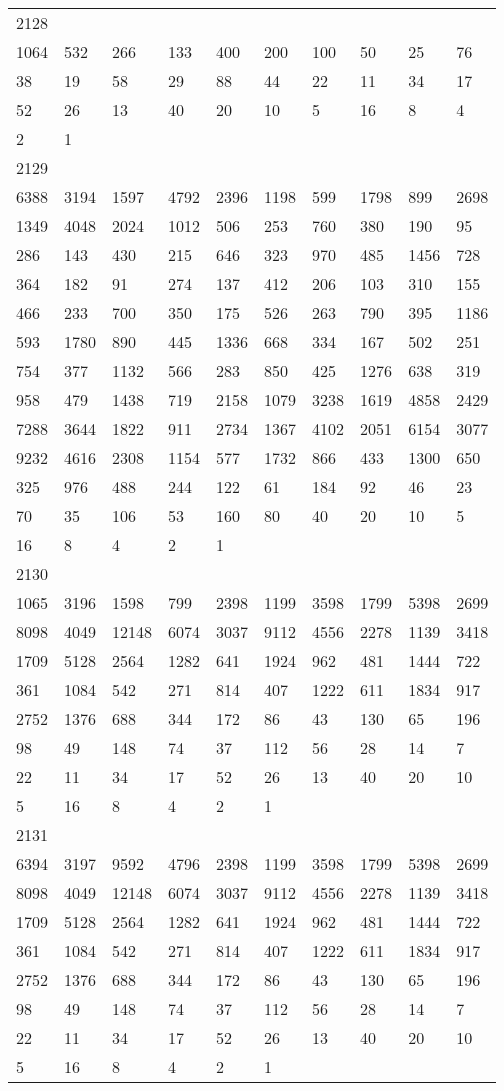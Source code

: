 \begin{longtable}{*{10}{l}}
2128&&&&&&&&&\\
1064& 532& 266& 133& 400& 200& 100& 50& 25& 76\\
38& 19& 58& 29& 88& 44& 22& 11& 34& 17\\
52& 26& 13& 40& 20& 10& 5& 16& 8& 4\\
2& 1& \\

2129&&&&&&&&&\\
6388& 3194& 1597& 4792& 2396& 1198& 599& 1798& 899& 2698\\
1349& 4048& 2024& 1012& 506& 253& 760& 380& 190& 95\\
286& 143& 430& 215& 646& 323& 970& 485& 1456& 728\\
364& 182& 91& 274& 137& 412& 206& 103& 310& 155\\
466& 233& 700& 350& 175& 526& 263& 790& 395& 1186\\
593& 1780& 890& 445& 1336& 668& 334& 167& 502& 251\\
754& 377& 1132& 566& 283& 850& 425& 1276& 638& 319\\
958& 479& 1438& 719& 2158& 1079& 3238& 1619& 4858& 2429\\
7288& 3644& 1822& 911& 2734& 1367& 4102& 2051& 6154& 3077\\
9232& 4616& 2308& 1154& 577& 1732& 866& 433& 1300& 650\\
325& 976& 488& 244& 122& 61& 184& 92& 46& 23\\
70& 35& 106& 53& 160& 80& 40& 20& 10& 5\\
16& 8& 4& 2& 1& \\

2130&&&&&&&&&\\
1065& 3196& 1598& 799& 2398& 1199& 3598& 1799& 5398& 2699\\
8098& 4049& 12148& 6074& 3037& 9112& 4556& 2278& 1139& 3418\\
1709& 5128& 2564& 1282& 641& 1924& 962& 481& 1444& 722\\
361& 1084& 542& 271& 814& 407& 1222& 611& 1834& 917\\
2752& 1376& 688& 344& 172& 86& 43& 130& 65& 196\\
98& 49& 148& 74& 37& 112& 56& 28& 14& 7\\
22& 11& 34& 17& 52& 26& 13& 40& 20& 10\\
5& 16& 8& 4& 2& 1& \\

2131&&&&&&&&&\\
6394& 3197& 9592& 4796& 2398& 1199& 3598& 1799& 5398& 2699\\
8098& 4049& 12148& 6074& 3037& 9112& 4556& 2278& 1139& 3418\\
1709& 5128& 2564& 1282& 641& 1924& 962& 481& 1444& 722\\
361& 1084& 542& 271& 814& 407& 1222& 611& 1834& 917\\
2752& 1376& 688& 344& 172& 86& 43& 130& 65& 196\\
98& 49& 148& 74& 37& 112& 56& 28& 14& 7\\
22& 11& 34& 17& 52& 26& 13& 40& 20& 10\\
5& 16& 8& 4& 2& 1& \\


\end{longtable}
